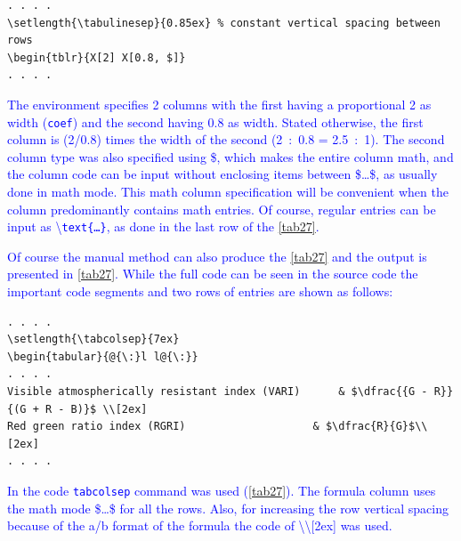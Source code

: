 \documentclass[phd,showgrids]{ndsu-thesis-2022}
\newcommand\italk[1]{\textcolor{blue}{#1}}  %
\newcommand\cmd[1]{\textbackslash\texttt{#1}}  %
\newcommand\vb[1]{\textcolor{blue}{\texttt{#1}}}%
\begin{document}
\vspace{-1ex}
{\singlespacing
\begin{verbatim}
. . . . 
\setlength{\tabulinesep}{0.85ex} % constant vertical spacing between rows
\begin{tblr}{X[2] X[0.8, $]}
. . . . 
\end{verbatim}
}

\vspace{-2ex}
\italk{The environment specifies 2 columns with the first having a proportional 2 as width (\vb{coef}) and the second having 0.8 as width. Stated otherwise, the first column is \fpeval{2/0.8} (2/0.8) times the width of the second (2~:~0.8 = 2.5~:~1). The second column type was also specified using \$, which makes the entire column math, and the column code can be input without enclosing items between \$\ldots\$, as usually done in math mode. This math column specification will be convenient when the column predominantly contains math entries. Of course, regular entries can be input as \cmd{text\{\ldots\}}, as done in the last row of the \cref{tab27}.
}

\italk{Of course the manual method can also produce the \cref{tab27} and the output is presented in \cref{tab27}.  While the full code can be seen in the source code the important code segments and two rows of entries are shown as follows:
}

{\singlespacing
\begin{verbatim}
. . . . 
\setlength{\tabcolsep}{7ex}
\begin{tabular}{@{\:}l l@{\:}}
. . . . 
Visible atmospherically resistant index (VARI) 		& $\dfrac{{G - R}}
{(G + R - B)}$ \\[2ex]
Red green ratio index (RGRI) 					& $\dfrac{R}{G}$\\[2ex]
. . . . 
\end{verbatim}
}

\vspace{-2ex}
\italk{In the code \vb{tabcolsep} command was used (\cref{tab27}). The formula column uses the math mode \$\ldots\$ for all the rows. Also, for increasing the row vertical spacing because of the a/b format of the formula the code of \textbackslash\textbackslash[2ex] was used.}
\end{document}
